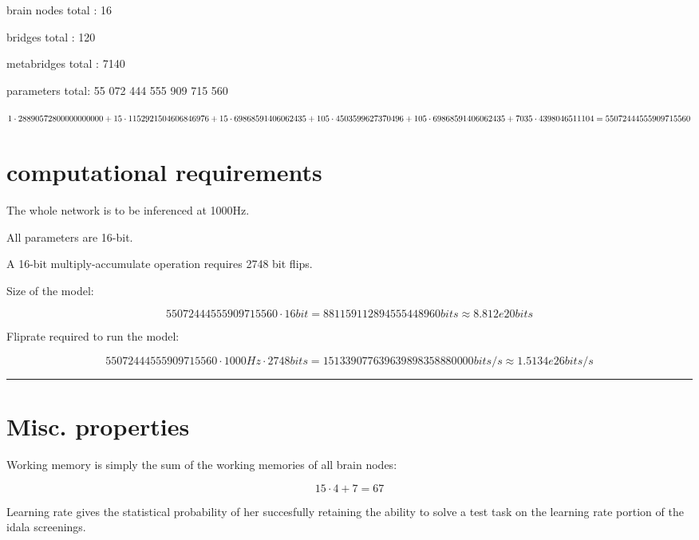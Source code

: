 \documentclass[a4paper]{article}
\begin{document}
    brain nodes total : 16
    
    bridges total : 120
    
    metabridges total : 7140
    
    parameters total: 55 072 444 555 909 715 560
    
    \bigskip
    
    \noindent
    $ 
    1 \cdot 28 890 572 800 000 000 000 + \\
    15 \cdot 1 152 921 504 606 846 976 + \\
    15 \cdot 69 868 591 406 062 435 + \\
    105 \cdot 4 503 599 627 370 496 + \\
    105 \cdot 69 868 591 406 062 435 + \\
    7035 \cdot 4 398 046 511 104 = \\
    55 072 444 555 909 715 560
    $
    
    \pagebreak
    
    \section{computational requirements}
    
    The whole network is to be inferenced at 1000Hz.
    
    All parameters are 16-bit.
    
    A 16-bit multiply-accumulate operation requires 2748 bit flips.
    
    \bigskip
    
    Size of the model:
    
    $$ 55 072 444 555 909 715 560 \cdot 16bit = 881159112894555448960 bits \approx 8.812e20 bits $$
    
    Fliprate required to run the model:
    
    $$ 55 072 444 555 909 715 560 \cdot 1000Hz \cdot 2748 bits = 151 339 077 639 639 898 358 880 000 bits/s \approx 1.5134e26 bits/s $$
    
    \rule{\linewidth}{1pt}
    
    \section{Misc. properties}
    
    Working memory is simply the sum of the working memories of all brain nodes:
    
    $$ 15 \cdot 4 + 7 = 67 $$
    
    Learning rate gives the statistical probability of her succesfully retaining the ability to solve a test task on the learning rate portion of the idala screenings.
    
\end{document}
